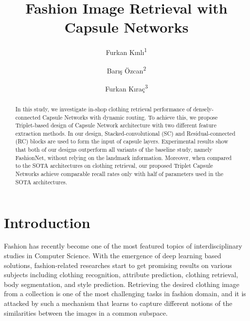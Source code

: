\documentclass[10pt,twocolumn,letterpaper]{article}
\begin{document}
\title{Fashion Image Retrieval with Capsule Networks}
\author{Furkan K{\i}nl{\i}\textsuperscript{1}}
\author{Bar{\i}\c{s} \"{O}zcan\textsuperscript{2}}
\author{Furkan K{\i}ra\c{c}\textsuperscript{3}}


\maketitle
\thispagestyle{empty}


\begin{abstract}
   In this study, we investigate in-shop clothing retrieval performance of densely-connected Capsule Networks with dynamic routing. To achieve this, we propose Triplet-based design of Capsule Network architecture with two different feature extraction methods. In our design, Stacked-convolutional (SC) and Residual-connected (RC) blocks are used to form the input of capsule layers. Experimental results show that both of our designs outperform all variants of the baseline study, namely FashionNet, without relying on the landmark information. Moreover, when compared to the SOTA architectures on clothing retrieval, our proposed Triplet Capsule Networks achieve comparable recall rates only with half of parameters used in the SOTA architectures.
\end{abstract}

\section{Introduction}

Fashion has recently become one of the most featured topics of interdisciplinary studies in Computer Science. With the emergence of deep learning based solutions, fashion-related researches start to get promising results on various subjects including clothing recognition, attribute prediction, clothing retrieval, body segmentation, and style prediction. Retrieving the desired clothing image from a collection is one of the most challenging tasks in fashion domain, and it is attacked by such a mechanism that learns to capture different notions of the similarities between the images in a common subspace. 
\end{document}
